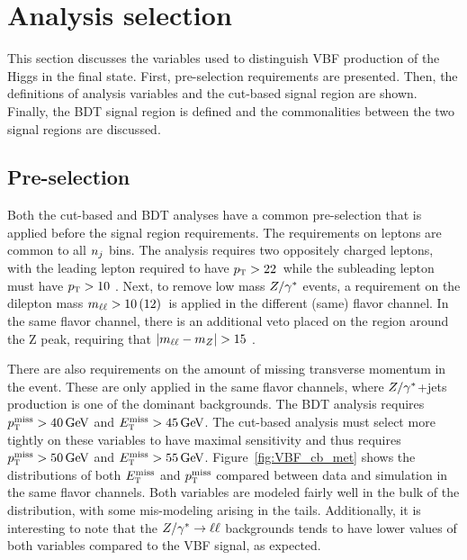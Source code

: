 \section{Analysis selection}

This section discusses the variables used to distinguish VBF production of the Higgs in the \HWWfull final state. First, pre-selection requirements are presented. Then, the definitions of analysis variables and the cut-based signal region are shown. Finally, the BDT signal region is defined and the commonalities between the two signal regions are discussed.  


\subsection{Pre-selection}
\label{sec:vbf_presel}
Both the cut-based and BDT analyses have a common pre-selection that is applied before the signal region requirements. The requirements on leptons are common to all $n_j$ bins. The analysis requires two oppositely charged leptons, with the leading lepton required to have $p_{\textrm{\footnotesize\sc t}} > 22$ \GeV\,while the subleading lepton must have $p_{\textrm{\footnotesize\sc t}} > 10$ \GeV. Next, to remove low mass $Z/\gamma^{\ast}$ events, a requirement on the dilepton mass $m_{\ell\ell} > 10\, (12)$ \GeV\,is applied in the different (same) flavor channel. In the same flavor channel, there is an additional veto placed on the region around the Z peak, requiring that $|m_{\ell\ell} - m_Z| > 15$ \GeV. 

There are also requirements on the amount of missing transverse momentum in the event. These are only applied in the same flavor channels, where $Z/\gamma^{\ast}$+jets production is one of the dominant backgrounds. The BDT analysis requires $\MPTj > 40 \GeV$ and $\MET > 45 \GeV$. The cut-based analysis must select more tightly on these variables to have maximal sensitivity and thus requires $\MPTj > 50 \GeV$ and $\MET > 55 \GeV$. Figure~\ref{fig:VBF_cb_met} shows the distributions of both $E_{\textrm{\footnotesize\sc t}}^{\rm miss}$ and $p_{\textrm{\footnotesize\sc t}}^{\rm miss}$ compared between data and simulation in the same flavor channels. Both variables are modeled fairly well in the bulk of the distribution, with some mis-modeling arising in the tails. Additionally, it is interesting to note that the $Z/\gamma^{\ast}\to \ell\ell$ backgrounds tends to have lower values of both variables compared to the VBF signal, as expected.

